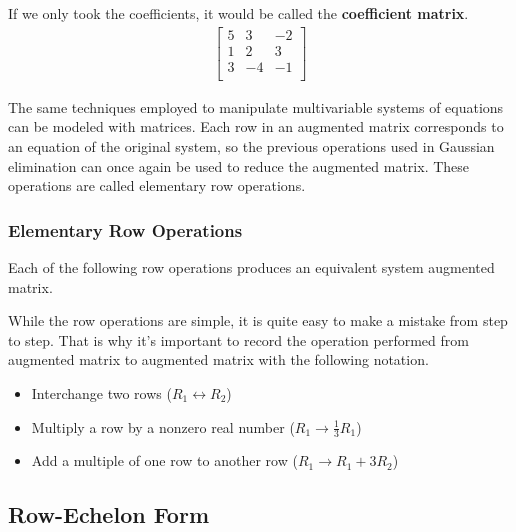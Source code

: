 \documentclass[11pt]{article}
\begin{document}
If we only took the coefficients, it would be called the \textbf{coefficient matrix}.
\begin{align*}
    \begin{bmatrix}
        5 & 3 & -2 \\
        1 & 2 & 3\\
        3 & -4 & -1\\
    \end{bmatrix}
\end{align*}

The same techniques employed to manipulate multivariable systems of equations can be modeled with matrices. Each row in an augmented matrix corresponds to an equation of the original system, so the previous operations used in Gaussian elimination can once again be used to reduce the augmented matrix. These operations are called elementary row operations.
\subsubsection*{Elementary Row Operations}
Each of the following row operations produces an equivalent system augmented matrix.

While the row operations are simple, it is quite easy to make a mistake from step to step. That is why it's important to record the operation performed from augmented matrix to augmented matrix with the following notation.

\begin{itemize}
    \item Interchange two rows ($R_1 \leftrightarrow R_2$)
    \item Multiply a row by a nonzero real number ($R_1 \rightarrow \frac{1}{3}R_1$)
    \item Add a multiple of one row to another row ($R_1 \rightarrow R_1 + 3R_2$)
\end{itemize}

\subsection{Row-Echelon Form}
\end{document}
